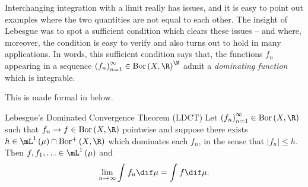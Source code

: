 \documentclass[pmath450]{subfiles}
\begin{document}
    Interchanging integration with a limit really has issues, and it is easy to point out examples where the two quantities are not equal to each other. The insight of Lebesgue was to spot a sufficient condition which clears these issues -- and where, moreover, the condition is easy to verify and also turns out to hold in many applications. In words, this sufficient condition says that, the functions $f_n$ appearing in a sequence $\left( f_{n} \right)^{\infty}_{n=1}\in\bor\left( X,\R \right)^{\N}$ admit a \textit{dominating function} which is integrable.
    
    This is made formal in below.

    \clearpage
    \begin{theorem}{Lebesgue's Dominated Convergence Theorem (LDCT)}
        Let $\left( f_{n} \right)^{\infty}_{n=1}\in\bor\left( X,\R \right)$ such that $f_n\to f\in\bor\left( X,\R \right)$ pointwise and suppose there exists $h\in\lone\left( \mu \right)\cap\borplus\left( X,\R \right)$ which dominates each $f_n$, in the sense that $\left| f_n \right|\leq h$. Then $f,f_1,\ldots\in\lone\left( \mu \right)$ and
        \begin{equation*}
            \lim_{n\to\infty}\int^{}_{}f_n\dif\mu = \int^{}_{}f\dif\mu.
        \end{equation*}
    \end{theorem}
\end{document}
